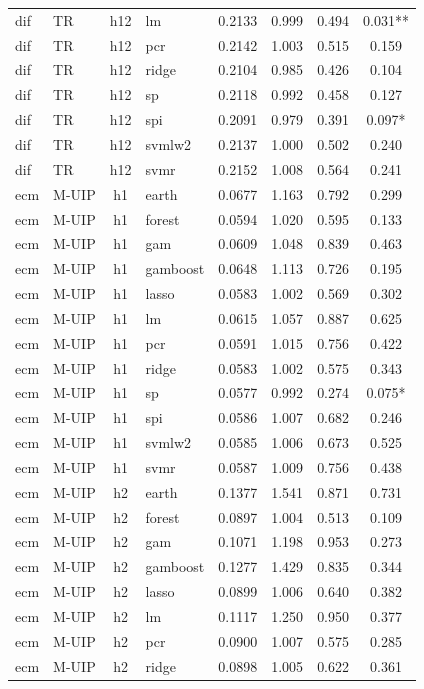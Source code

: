 \begin{ThreePartTable}
\begin{longtable}[t]{llclcccc}
dif & TR & h12 & lm & 0.2133 & 0.999 & 0.494 & 0.031**\\
dif & TR & h12 & pcr & 0.2142 & 1.003 & 0.515 & 0.159\\
dif & TR & h12 & ridge & 0.2104 & 0.985 & 0.426 & 0.104\\
dif & TR & h12 & sp & 0.2118 & 0.992 & 0.458 & 0.127\\
dif & TR & h12 & spi & 0.2091 & 0.979 & 0.391 & 0.097*\\
dif & TR & h12 & svmlw2 & 0.2137 & 1.000 & 0.502 & 0.240\\
dif & TR & h12 & svmr & 0.2152 & 1.008 & 0.564 & 0.241\\
\addlinespace
ecm & M-UIP & h1 & earth & 0.0677 & 1.163 & 0.792 & 0.299\\
ecm & M-UIP & h1 & forest & 0.0594 & 1.020 & 0.595 & 0.133\\
ecm & M-UIP & h1 & gam & 0.0609 & 1.048 & 0.839 & 0.463\\
ecm & M-UIP & h1 & gamboost & 0.0648 & 1.113 & 0.726 & 0.195\\
ecm & M-UIP & h1 & lasso & 0.0583 & 1.002 & 0.569 & 0.302\\
ecm & M-UIP & h1 & lm & 0.0615 & 1.057 & 0.887 & 0.625\\
ecm & M-UIP & h1 & pcr & 0.0591 & 1.015 & 0.756 & 0.422\\
ecm & M-UIP & h1 & ridge & 0.0583 & 1.002 & 0.575 & 0.343\\
ecm & M-UIP & h1 & sp & 0.0577 & 0.992 & 0.274 & 0.075*\\
ecm & M-UIP & h1 & spi & 0.0586 & 1.007 & 0.682 & 0.246\\
ecm & M-UIP & h1 & svmlw2 & 0.0585 & 1.006 & 0.673 & 0.525\\
ecm & M-UIP & h1 & svmr & 0.0587 & 1.009 & 0.756 & 0.438\\
\addlinespace
ecm & M-UIP & h2 & earth & 0.1377 & 1.541 & 0.871 & 0.731\\
ecm & M-UIP & h2 & forest & 0.0897 & 1.004 & 0.513 & 0.109\\
ecm & M-UIP & h2 & gam & 0.1071 & 1.198 & 0.953 & 0.273\\
ecm & M-UIP & h2 & gamboost & 0.1277 & 1.429 & 0.835 & 0.344\\
ecm & M-UIP & h2 & lasso & 0.0899 & 1.006 & 0.640 & 0.382\\
ecm & M-UIP & h2 & lm & 0.1117 & 1.250 & 0.950 & 0.377\\
ecm & M-UIP & h2 & pcr & 0.0900 & 1.007 & 0.575 & 0.285\\
ecm & M-UIP & h2 & ridge & 0.0898 & 1.005 & 0.622 & 0.361\\

\end{longtable}
\end{ThreePartTable}
